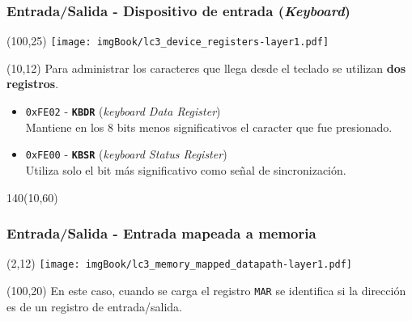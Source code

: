 \documentclass[aspectratio=169]{beamer}
\begin{document}
\begin{frame}[t,fragile]
    \frametitle{Entrada/Salida - Dispositivo de entrada (\emph{Keyboard})}
    \begin{textblock}{65}(100,25) \texttt{[image: imgBook/lc3\_device\_registers-layer1.pdf]} \end{textblock}
    \begin{textblock}{75}(10,12)
    Para administrar los caracteres que llega desde el teclado se utilizan \textbf{dos registros}.\\
    \bigskip
    \begin{itemize}
     \item<2-> \textcolor{naranjauca}{\texttt{0xFE02}} - \textbf{\texttt{KBDR}} (\emph{keyboard Data Register})\\
     Mantiene en los 8 bits menos significativos el caracter que fue presionado.
     \item<3-> \textcolor{naranjauca}{\texttt{0xFE00}} - \textbf{\texttt{KBSR}} (\emph{keyboard Status Register})\\
     Utiliza solo el bit más significativo como señal de sincronización.
    \end{itemize}
    \end{textblock}
    \begin{textblock}{140}(10,60)
    \bigskip
    \end{textblock}
\end{frame}

\begin{frame}[t,fragile]
    \frametitle{Entrada/Salida - Entrada mapeada a memoria}
    \begin{textblock}{65}(2,12) \texttt{[image: imgBook/lc3\_memory\_mapped\_datapath-layer1.pdf]} \end{textblock}
    \begin{textblock}{50}(100,20)
    En este caso, cuando se carga el registro \texttt{MAR} \textcolor{verdeuca}{se identifica si la dirección es de un registro de entrada/salida.}\\
    \bigskip
    \end{textblock}
\end{frame}
\end{document}
